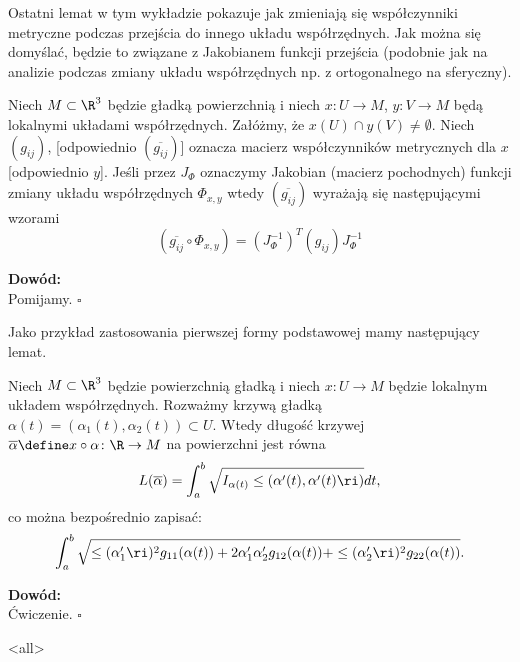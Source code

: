 Ostatni lemat w tym wykładzie pokazuje jak zmieniają się współczynniki metryczne podczas przejścia do innego układu współrzędnych. Jak można się domyślać, będzie to związane z Jakobianem funkcji przejścia (podobnie jak na analizie podczas zmiany układu współrzędnych np. z ortogonalnego na sferyczny).

\begin{frame}

\begin{lemat}
Niech $M\subset \R^3$ będzie gładką powierzchnią i niech $x\colon U\to M$, $y\colon V\to M$ będą lokalnymi układami współrzędnych. Załóżmy, że $x(U)\cap y(V)\neq \emptyset$. \pause Niech $(g_{ij})$, [odpowiednio $(\overline{g_{ij}})$] oznacza macierz współczynników metrycznych dla $x$ [odpowiednio $y$]. \pause Jeśli przez $J_\Phi$ oznaczymy Jakobian (macierz pochodnych) funkcji zmiany układu współrzędnych $\Phi_{x,y}$ wtedy $(\overline{g_{ij}})$ wyrażają się następującymi wzorami\pause 
\[(\overline{g_{ij}}\circ \Phi_{x,y})=(J_\Phi^{-1})^T (g_{ij})J_\Phi^{-1}\]
\end{lemat}
\pause \textcolor{ared}{\textbf{Dowód:}}\\
Pomijamy.
\hfill $\square$
\end{frame}
\begin{frame}
Jako przykład zastosowania pierwszej formy podstawowej mamy następujący lemat.
\pause \begin{lemat}
Niech $M\subset \R^3$ będzie powierzchnią gładką i niech $x\colon U\to M$ będzie lokalnym układem współrzędnych. Rozważmy krzywą gładką $\alpha(t)=(\alpha_1(t),\alpha_2(t))\subset U$.
\pause Wtedy długość krzywej $\overline{\alpha}\define x\circ\alpha\colon \R\to M$ na powierzchni jest równa
\[L(\overline{\alpha})=\int_a^b\sqrt{I_{\alpha(t)}\le(\alpha'(t),\alpha'(t)\ri)}dt,\]
\pause co można bezpośrednio zapisać:
\[\int_a^b\sqrt{\le(\alpha_1'\ri)^2 g_{11}(\alpha(t))+ 2 \alpha_1'\alpha_2'g_{12}(\alpha(t))+\le(\alpha_2'\ri)^2 g_{22}(\alpha(t))}.\]
\end{lemat}

\pause \textcolor{ared}{\textbf{Dowód:}}\\
Ćwiczenie.
\hfill $\square$


\end{frame}

\mode<all> 
